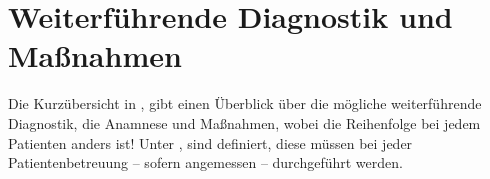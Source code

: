 % 
% 
% 
% 
% 
% 
% 
% 
% 
% 
% 
% 
% 

\begin{Literary}



\end{Literary}



\section{Weiterführende Diagnostik und
Maßnahmen}


Die Kurzübersicht in 
, gibt einen
Überblick über die mögliche weiterführende Diagnostik, die
Anamnese und Maßnahmen, wobei die
Reihenfolge bei jedem Patienten anders ist!
Unter , 
 sind  definiert, diese 
müssen bei jeder Patientenbetreuung -- sofern angemessen --
durchgeführt werden.


